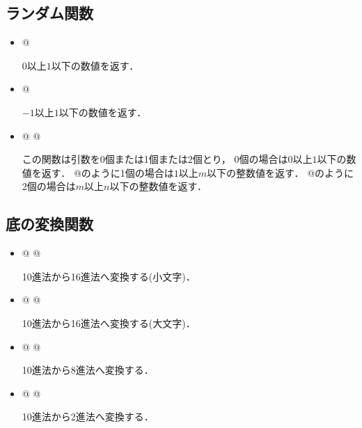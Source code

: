 \documentclass[a4j,uplatex,dvipdfmx]{jsarticle}
\begin{document}
\subsection{ランダム関数}
\begin{itemize}
 \item \verb@\pgfmathrnd@
       \verb@{}@

       $0$以上$1$以下の数値を返す．
 \item \verb@pgfmathrand@
       \verb@{}@

       $-1$以上$1$以下の数値を返す．
 \item \verb@{}@
       \verb@{}@

       この関数は引数を0個または1個または2個とり，
       0個の場合は\verb@{}$0$以上$1$以下の数値を返す．
       \verb@{}@のように1個の場合は$1$以上$m$以下の整数値を返す．
       \verb@{}@のように2個の場合は$m$以上$n$以下の整数値を返す．
\end{itemize}
\subsection{底の変換関数}
\begin{itemize}
 \item \verb@{}@
       \verb@{}@

       10進法から16進法へ変換する(小文字)．
 \item \verb@{}@
       \verb@{}@

       10進法から16進法へ変換する(大文字)．
 \item \verb@{}@
       \verb@{}@

       10進法から8進法へ変換する．
 \item \verb@{}@
       \verb@{}@

       10進法から2進法へ変換する．
\end{itemize}
\end{document}
